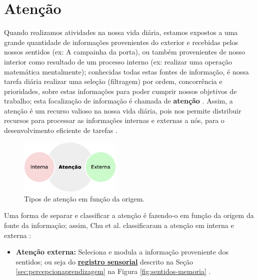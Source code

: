 \section{Atenção}
\label{sec:atencao}
Quando realizamos atividades na nossa vida diária, 
estamos expostos a uma grande quantidade de informações  
provenientes do exterior e recebidas pelos nossos sentidos (ex: A campainha da porta),
ou também provenientes de nosso interior como resultado de um processo interno 
(ex: realizar uma operação matemática mentalmente);
conhecidas todas estas fontes de informação,
é nossa tarefa diária realizar uma seleção (filtragem) por ordem, concorrência e prioridades,
sobre estas informações para poder cumprir nossos objetivos de trabalho;
esta focalização de informação é chamada de \textbf{atenção} \cite[pp. 99]{pake2019psicologia}.
Assim, a atenção é um recurso valioso na nossa vida diária, 
pois nos permite distribuir recursos para processar as informações internas e externas
a nós, para o desenvolvimento eficiente de tarefas \cite[pp. 155]{eysenck2017manual}. 

\begin{figure}
  \vspace{-20pt}
  \centering
  \includegraphics[width=0.435\textwidth]{chapters/cap-learning/attention2.eps}
  \vspace{-10pt}
\caption{Tipos de atenção em função da origem.}
\label{fig:attention2}
\end{figure}
Uma forma de separar e classificar  a atenção é fazendo-o
em função da origem da fonte da informação;
assim, Chu et al. classificaram a atenção em interna e externa \cite{ExternalInternalAttention} \cite[pp. 155]{eysenck2017manual}:
\begin{itemize}
\item \textbf{Atenção externa:} 
Seleciona e modula a informação proveniente dos sentidos;
ou seja do \hyperref[sec:percepcionaprendizagem]{\textbf{registro sensorial}}
descrito na Seção \ref{sec:percepcionaprendizagem} na Figura \ref{fig:sentidos-memoria}
\cite{ExternalInternalAttention} \cite[pp. 155]{eysenck2017manual}.
\end{itemize}


